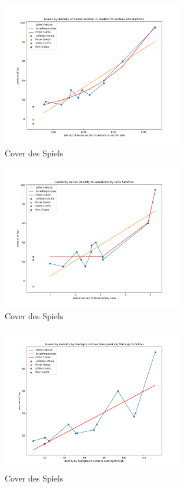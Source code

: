 \documentclass[german,a4paper, 12pt]{scrartcl}
\begin{document}
\begin{figure}[H]
	\centering
	\includegraphics[width=0.7\textwidth]{fig64/g04_densityDenseSections.png}
	\caption[]{Cover des Spiels}
	\label{img:cover}
\end{figure}
\begin{figure}[H]
	\centering
	\includegraphics[width=0.7\textwidth]{fig64/g05_denseDensitytolooseDensity.png}
	\caption[]{Cover des Spiels}
	\label{img:cover}
\end{figure}
\begin{figure}
	\centering
	\includegraphics[width=0.7\textwidth]{fig64/g06_densitybybackgorundsections.png}
	\caption[]{Cover des Spiels}
	\label{img:cover}
\end{figure}
\end{document}
